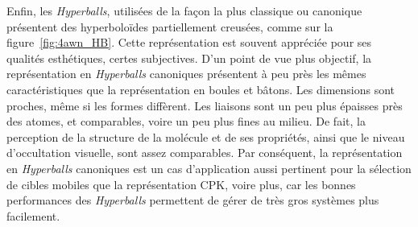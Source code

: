 	Enfin, les \emph{Hyperballs}, utilisées de la façon la plus \og classique \fg{} ou \og canonique \fg{} présentent des hyperboloïdes partiellement creusées, comme sur la figure~\ref{fig:4awn_HB}. Cette représentation est souvent appréciée pour ses qualités esthétiques, certes subjectives. D'un point de vue plus objectif, la représentation en \emph{Hyperballs} canoniques présentent à peu près les mêmes caractéristiques que la représentation en boules et bâtons. Les dimensions sont proches, même si les formes diffèrent. Les liaisons sont un peu plus épaisses près des atomes, et comparables, voire un peu plus fines au milieu. De fait, la perception de la structure de la molécule et de ses propriétés, ainsi que le niveau d'occultation visuelle, sont assez comparables. Par conséquent, la représentation en \emph{Hyperballs} canoniques est un cas d'application aussi pertinent pour la sélection de cibles mobiles que la représentation CPK, voire plus, car les bonnes performances des \emph{Hyperballs} permettent de gérer de très gros systèmes plus facilement.
		
